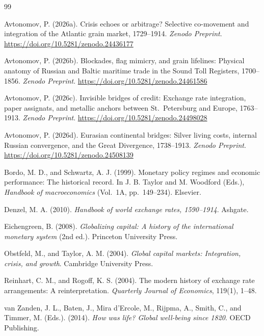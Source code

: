 \documentclass[11pt,a4paper]{article}
\begin{document}
\begin{thebibliography}{99}

Avtonomov, P. (2026a). Crisis echoes or arbitrage? Selective co-movement and integration of the Atlantic grain market, 1729--1914. \emph{Zenodo Preprint}. \url{https://doi.org/10.5281/zenodo.24436177}

Avtonomov, P. (2026b). Blockades, flag mimicry, and grain lifelines: Physical anatomy of Russian and Baltic maritime trade in the Sound Toll Registers, 1700--1856. \emph{Zenodo Preprint}. \url{https://doi.org/10.5281/zenodo.24461586}

Avtonomov, P. (2026c). Invisible bridges of credit: Exchange rate integration, paper assignats, and metallic anchors between St.~Petersburg and Europe, 1763--1913. \emph{Zenodo Preprint}. \url{https://doi.org/10.5281/zenodo.24498028}

Avtonomov, P. (2026d). Eurasian continental bridges: Silver living costs, internal Russian convergence, and the Great Divergence, 1738--1913. \emph{Zenodo Preprint}. \url{https://doi.org/10.5281/zenodo.24508139}

Bordo, M. D., and Schwartz, A. J. (1999). Monetary policy regimes and economic performance: The historical record. In J. B. Taylor and M. Woodford (Eds.), \emph{Handbook of macroeconomics} (Vol.~1A, pp.~149--234). Elsevier.

Denzel, M. A. (2010). \emph{Handbook of world exchange rates, 1590--1914}. Ashgate.

Eichengreen, B. (2008). \emph{Globalizing capital: A history of the international monetary system} (2nd ed.). Princeton University Press.

Obstfeld, M., and Taylor, A. M. (2004). \emph{Global capital markets: Integration, crisis, and growth}. Cambridge University Press.

Reinhart, C. M., and Rogoff, K. S. (2004). The modern history of exchange rate arrangements: A reinterpretation. \emph{Quarterly Journal of Economics}, 119(1), 1--48.

van Zanden, J. L., Baten, J., Mira d'Ercole, M., Rijpma, A., Smith, C., and Timmer, M. (Eds.). (2014). \emph{How was life? Global well-being since 1820}. OECD Publishing.

\end{thebibliography}
\end{document}
